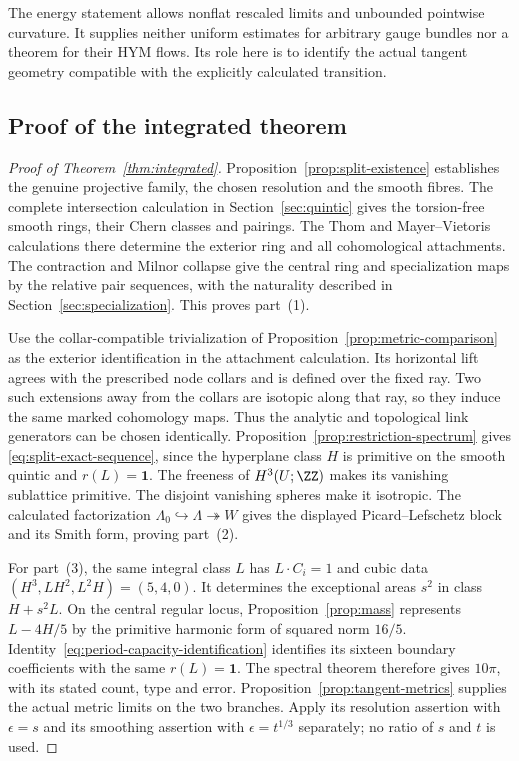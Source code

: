 The energy statement allows nonflat rescaled limits and unbounded
pointwise curvature. It supplies neither uniform estimates for arbitrary
gauge bundles nor a theorem for their HYM flows. Its role here is to
identify the actual tangent geometry compatible with the explicitly
calculated transition.

\subsection{Proof of the integrated theorem}
\begin{proof}[Proof of Theorem~\ref{thm:integrated}]
Proposition~\ref{prop:split-existence} establishes the genuine projective
family, the chosen resolution and the smooth fibres. The complete
intersection calculation in Section~\ref{sec:quintic} gives the
torsion-free smooth rings, their Chern classes and pairings. The Thom
and Mayer--Vietoris calculations there determine the exterior ring and
all cohomological attachments. The contraction and Milnor collapse
give the central ring and specialization maps by the relative pair
sequences, with the naturality described in
Section~\ref{sec:specialization}. This proves part~(1).

Use the collar-compatible trivialization of
Proposition~\ref{prop:metric-comparison} as the exterior identification
in the attachment calculation. Its horizontal lift agrees with the
prescribed node collars and is defined over the fixed ray. Two such
extensions away from the collars are isotopic along that ray, so they
induce the same marked cohomology maps. Thus the analytic and
topological link generators can be chosen identically.
Proposition~\ref{prop:restriction-spectrum} gives
\eqref{eq:split-exact-sequence}, since the hyperplane class $H$ is
primitive on the smooth quintic and $r(L)=\mathbf1$.
The freeness of $H^3(U;\ZZ)$ makes its vanishing sublattice primitive.
The disjoint vanishing spheres make it isotropic. The calculated
factorization $\Lambda_0\hookrightarrow\Lambda\twoheadrightarrow W$ gives
the displayed Picard--Lefschetz block and its Smith form, proving
part~(2).

For part~(3), the same integral class $L$ has
$L\cdot C_i=1$ and cubic data $(H^3,LH^2,L^2H)=(5,4,0)$.
It determines the exceptional areas $s^2$ in class $H+s^2L$.
On the central regular locus, Proposition~\ref{prop:mass} represents
$L-4H/5$ by the primitive harmonic form of squared norm $16/5$.
Identity~\eqref{eq:period-capacity-identification} identifies its
sixteen boundary coefficients with the same $r(L)=\mathbf1$.
The spectral theorem therefore gives $10\pi$, with its stated
count, type and error. Proposition~\ref{prop:tangent-metrics}
supplies the actual metric limits on the two branches. Apply its
resolution assertion with $\epsilon=s$ and its smoothing assertion
with $\epsilon=t^{1/3}$ separately; no ratio of $s$ and $t$ is used.


\end{proof}
